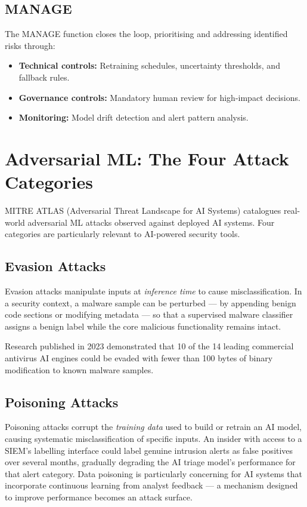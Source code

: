 \documentclass[12pt,a4paper]{article}
\begin{document}
\subsection{MANAGE}
The MANAGE function closes the loop, prioritising and addressing identified risks through:
\begin{itemize}
    \item \textbf{Technical controls:} Retraining schedules, uncertainty thresholds, and fallback rules.
    \item \textbf{Governance controls:} Mandatory human review for high-impact decisions.
    \item \textbf{Monitoring:} Model drift detection and alert pattern analysis.
\end{itemize}

\section{Adversarial ML: The Four Attack Categories}

MITRE ATLAS (Adversarial Threat Landscape for AI Systems) catalogues real-world adversarial ML attacks observed against deployed AI systems. Four categories are particularly relevant to AI-powered security tools.

\subsection{Evasion Attacks}
Evasion attacks manipulate inputs at \emph{inference time} to cause misclassification. In a security context, a malware sample can be perturbed --- by appending benign code sections or modifying metadata --- so that a supervised malware classifier assigns a benign label while the core malicious functionality remains intact.

\begin{example}
Research published in 2023 demonstrated that 10 of the 14 leading commercial antivirus AI engines could be evaded with fewer than 100 bytes of binary modification to known malware samples.
\end{example}

\subsection{Poisoning Attacks}
Poisoning attacks corrupt the \emph{training data} used to build or retrain an AI model, causing systematic misclassification of specific inputs. An insider with access to a SIEM's labelling interface could label genuine intrusion alerts as false positives over several months, gradually degrading the AI triage model's performance for that alert category. Data poisoning is particularly concerning for AI systems that incorporate continuous learning from analyst feedback --- a mechanism designed to improve performance becomes an attack surface.
\end{document}

